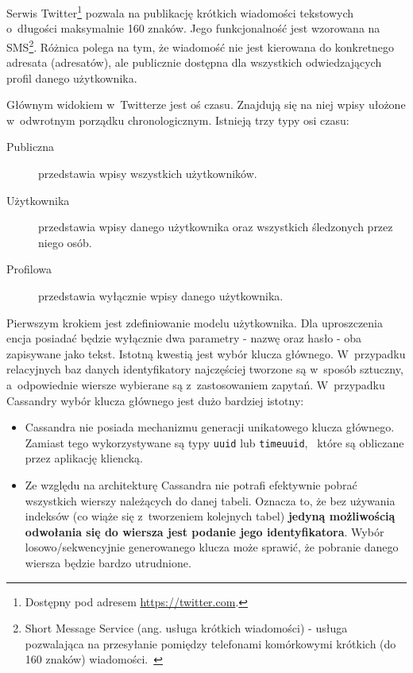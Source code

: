 Serwis Twitter\footnote{Dostępny pod adresem \url{https://twitter.com}.} pozwala na publikację krótkich wiadomości tekstowych o~długości maksymalnie 160 znaków. Jego funkcjonalność jest wzorowana na SMS\footnote{Short Message Service (ang. usługa krótkich wiadomości) - usługa pozwalająca na przesyłanie pomiędzy telefonami komórkowymi krótkich (do 160 znaków) wiadomości.~\cite{sms_definition}}. Różnica polega na tym, że wiadomość nie jest kierowana do konkretnego adresata (adresatów), ale publicznie dostępna dla wszystkich odwiedzających profil danego użytkownika.

Głównym widokiem w~Twitterze jest oś czasu. Znajdują się na niej wpisy ułożone w~odwrotnym porządku chronologicznym. Istnieją trzy typy osi czasu:

\begin{description}
	\item[Publiczna] przedstawia wpisy wszystkich użytkowników.
	\item[Użytkownika] przedstawia wpisy danego użytkownika oraz wszystkich śledzonych przez niego osób.
	\item[Profilowa] przedstawia wyłącznie wpisy danego użytkownika.
\end{description}

Pierwszym krokiem jest zdefiniowanie modelu użytkownika. Dla uproszczenia encja posiadać będzie wyłącznie dwa parametry - nazwę oraz hasło - oba zapisywane jako tekst. Istotną kwestią jest wybór klucza głównego. W~przypadku relacyjnych baz danych identyfikatory najczęściej tworzone są w~sposób sztuczny, a~odpowiednie wiersze wybierane są z~zastosowaniem zapytań. W~przypadku Cassandry wybór klucza głównego jest dużo bardziej istotny:

\begin{itemize}
	\item Cassandra nie posiada mechanizmu generacji unikatowego klucza głównego. Zamiast tego wykorzystywane są typy \verb+uuid+ lub \verb+timeuuid+,~\cite{uuid_timeuuid} które są obliczane przez aplikację kliencką. 
	\item Ze względu na architekturę Cassandra nie potrafi efektywnie pobrać wszystkich wierszy należących do danej tabeli. Oznacza to, że bez używania indeksów (co wiąże się z~tworzeniem kolejnych tabel) \textbf{jedyną możliwością odwołania się do wiersza jest podanie jego identyfikatora}. Wybór losowo/sekwencyjnie generowanego klucza może sprawić, że pobranie danego wiersza będzie bardzo utrudnione.
\end{itemize}

